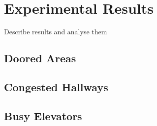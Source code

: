
\chapter{Experimental Results}
Describe results and analyse them

\section{ Doored Areas }

\section{ Congested Hallways }


\section{ Busy Elevators }
